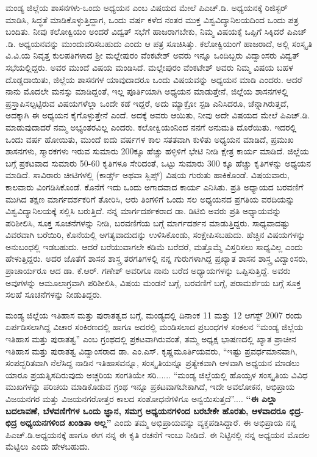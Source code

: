 ಮಂಡ್ಯ ಜಿಲ್ಲೆಯ ಶಾಸನಗಳು-ಒಂದು ಅಧ್ಯಯನ ಎಂಬ ವಿಷಯದ ಮೇಲೆ ಪಿಎಚ್​.ಡಿ. ಅಧ್ಯಯನಕ್ಕೆ ರಿಜಿಸ್ಟರ್​ ಮಾಡಿಸಿ, ಸಿದ್ಧತೆ ಮಾಡಿಕೊಳ್ಳುತ್ತಿದ್ದಾಗ, ಒಂದು ವರ್ಷ ಕಳೆದ ನಂತರ ಮುಕ್ತ ವಿಶ್ವವಿದ್ಯಾನಿಲಯದಿಂದ ಒಂದು ಪತ್ರ ಬಂದಿತು. ನೀವು ಕಲೋಕ್ವಿಯಂ ಅಂದರೆ ವಿದ್ವತ್​ ಸಭೆಗೆ ಹಾಜರಾಗಬೇಕು, ನಿಮ್ಮ ವಿಷಯಕ್ಕೆ ಒಪ್ಪಿಗೆ ಸಿಕ್ಕಿದರೆ ಪಿಎಚ್​.ಡಿ. ಅಧ್ಯಯನವನ್ನು ಮುಂದುವರಿಸಬಹುದು ಎಂದು ಆ ಪತ್ರ ಸೂಚಿಸಿತ್ತು. ಕಲೋಕ್ವಿಯಂಗೆ ಹಾಜರಾದೆ, ಅಲ್ಲಿ ಸಂಸ್ಕೃತಿ ವಿ.ವಿ.ಯ ನಿವೃತ್ತ ಕುಲಪತಿಗಳಾದ ಶ‍್ರೀ ಮಲ್ಲೇಪುರಂ ವೆಂಕಟೇಶ್​ ಅವರು ಇನ್ನೂ ಒಂದಿಬ್ಬರು ವಿದ್ವಾಂಸರು ವಿದ್ವತ್​ ಸಭೆಯಲ್ಲಿದ್ದರು. ಅವರ ಮುಂದೆ ವಿಷಯ ಮಂಡಿಸಿದೆ. ಮಲ್ಲೇಪುರಂ ವೆಂಕಟೇಶ್​ ಅವರು ನಿಮ್ಮ ವಿಷಯ ಬಹಳ ದೊಡ್ಡದಾಯಿತು, ಜಿಲ್ಲೆಯ ಶಾಸನಗಳ ಯಾವುದಾದರೂ ಒಂದು ವಿಷಯವನ್ನು ಅಧ್ಯಯನ ಮಾಡಿ ಎಂದರು. ಆದರೆ ನಾನು ಮೊದಲೇ ಮನಸ್ಸು ಮಾಡಿದ್ದಂತೆ, ಇಲ್ಲ ಪೂರ್ತಿಯಾಗಿ ಅಧ್ಯಯನ ಮಾಡುತ್ತೇನೆ, ಜಿಲ್ಲೆಯ ಶಾಸನಗಳಲ್ಲಿ ಪ್ರಸ್ತಾಪಿಸಲ್ಪಟ್ಟಿರುವ ವಿಷಯಗಳೆಲ್ಲಾ ಒಂದೇ ಕಡೆ ಇದ್ದರೆ, ಅದು ಮ್ಯಾಕ್ರೋ ಸ್ಟಡಿ ಎನಿಸಿದರೂ, ಚೆನ್ನಾಗಿರುತ್ತದೆ, ಅದಕ್ಕಾಗಿ ಈ ಅಧ್ಯಯನ ಕೈಗೊಳ್ಳುತ್ತೇನೆ ಎಂದೆ. ಅದಕ್ಕೆ ಅವರು ಆಯಿತು, ನೀವು ಅದೇ ವಿಷಯದ ಮೇಲೆ ಪಿಎಚ್​.ಡಿ. ಮಾಡುವುದಾದರೆ ನಮ್ಮ ಅಭ್ಯಂತರವಿಲ್ಲ ಎಂದರು. ಕಲೋಕ್ವಿಯಂನಿಂದ ನನಗೆ ಅನುಮತಿ ದೊರೆಯಿತು. ಇದರಲ್ಲಿ ಒಂದು ವರ್ಷ ಹೋಯಿತು, ಮುಂದೆ ಐದು ವರ್ಷಗಳ ಕಾಲ ಸತತವಾಗಿ ಕುಳಿತು ಅಧ್ಯಯನ ಮಾಡಿದೆ, ಪ್ರಮುಖ ಶಾಸನಗಳು, ಸ್ಮಾರಕಗಳು ಇರುವ ಸುಮಾರು 200ಕ್ಕೂ ಹೆಚ್ಚು ಹಳ್ಳಿಳಿಗೆ ಭೇಟಿ ನೀಡಿ ಕ್ಷೇತ್ರ ಕಾರ್ಯ ಮಾಡಿದೆ. ಜಿಲ್ಲೆಯ ಬಗ್ಗೆ ಪ್ರಕಟವಾದ ಸುಮಾರು 50-60 ಕೃತಿಗಳೂ ಸೇರಿದಂತೆ, ಒಟ್ಟು ಸುಮಾರು 300 ಕ್ಕೂ ಹೆಚ್ಚು ಕೃತಿಗಳನ್ನು ಅಧ್ಯಯನ ಮಾಡಿದೆ. ಸಾವಿರಾರು ಚೀಟಿಗಳಲ್ಲಿ (ಕಾರ್ಡ್ಸ್ ಅಥವಾ ಸ್ಲಿಪ್ಸ್​) ವಿಷಯ ಗುರುತು ಹಾಕಿಕೊಂಡೆ. ವಿಷಯವಾರು, ಕಾಲವಾರು ವಿಂಗಡಿಸಿಕೊಂಡೆ. ಕೊನೆಗೆ ಇದು ಒಂದು ಅಗಾದವಾದ ಕಾರ್ಯ ಎನಿಸಿತು. ಪ್ರತಿ ಅಧ್ಯಾಯದ ಬರವಣಿಗೆ ಮುಗಿದ ತಕ್ಷಣ ಮಾರ್ಗದರ್ಶಕರಿಗೆ ತೋರಿಸಿ, ಆರು ತಿಂಗಳಿಗೆ ಒಂದು ಸಲ ಅಧ್ಯಯನದ ಪ್ರಗತಿಯ ವರದಿಯನ್ನು ವಿಶ್ವವಿದ್ಯಾನಿಲಯಕ್ಕೆ ಸಲ್ಲಿಸಿ ಬರುತ್ತಿದೆ. ನನ್ನ ಮಾರ್ಗದರ್ಶಕರಾದ ಡಾ. ಡಿಟಿಬಿ ಅವರು ಪ್ರತಿ ಅಧ್ಯಾಯವನ್ನು ಪರಿಶೀಲಿಸಿ, ಸೂಕ್ತ ಸೂಚನೆಗಳನ್ನು ನೀಡಿ, ಬರವಣಿಗೆಯ ಬಗ್ಗೆ ಮಾರ್ಗದರ್ಶನ ಮಾಡುತ್ತಿದ್ದರು. ಸಾಧ್ಯವಾದಷ್ಟು ವಿವರವಾಗಿ ಬರೆಯಿರಿ, ಕೊನೆಯಲ್ಲಿ ಅಗತ್ಯವಾದುದನ್ನು ಉಳಿಸಿಕೊಂಡು, ಸಂಕ್ಷೇಪಿಸಬಹುದು. ಹೆಚ್ಚಿನ ವಿಷಯಗಳನ್ನು ಅನುಬಂಧಲ್ಲಿ ಇಡಬಹುದು. ಆದರೆ ಬರೆಯುವಾಗಲೇ ಕಡಿಮೆ ಬರೆದರೆ, ಮತ್ತೊಮ್ಮೆ ವಿಸ್ತರಿಸಲು ಸಾಧ್ಯವಿಲ್ಲ ಎಂದು ಹೇಳುತ್ತಿದ್ದರು. ಅದರ ಜೊತೆಗೆ ಶಾಸನ ಶಾಸ್ತ್ರ ತರಗತಿಗಳಲ್ಲಿ ನನ್ನ ಗುರುಗಳಾಗಿದ್ದ ಪ್ರಖ್ಯಾತ ಶಾಸನ ಶಾಸ್ತ್ರ ವಿದ್ವಾಂಸರು, ಪ್ರಾಚಾರ್ಯರೂ ಆದ ಡಾ. ಕೆ.ಆರ್​. ಗಣೇಶ್​ ಅವರಿಗೂ ನಾನು ಬರೆದ ಅಧ್ಯಾಯಗಳನ್ನು ಒಪ್ಪಿಸುತ್ತಿದ್ದೆ. ಅವರು ಅವುಗಳನ್ನು ಆಮೂಲಾಗ್ರವಾಗಿ ಪರಿಶೀಲಿಸಿ, ವಿಷಯ ಮಂಡನೆ ಬಗ್ಗೆ, ಬರವಣಿಗೆ ಬಗ್ಗೆ, ಪರಾಮರ್ಶೆಯ ಬಗ್ಗೆ ಸೂಕ್ತ ಸಲಹೆ ಸೂಚನೆಗಳನ್ನು ನೀಡುತಿದ್ದರು.

ಮಂಡ್ಯ ಜಿಲ್ಲೆಯ ಇತಿಹಾಸ ಮತ್ತು ಪುರಾತತ್ವದ ಬಗ್ಗೆ, ಮಂಡ್ಯದಲ್ಲಿ ದಿನಾಂಕ 11 ಮತ್ತು 12 ಆಗಸ್ಟ್​ 2007 ರಂದು ಏರ್ಪಡಿಸಲಾಗಿದ್ದ ವಿಚಾರ ಸಂಕಿರಣದಲ್ಲಿ ಹಾಗೂ ಅದರಲ್ಲಿ ಮಂಡಿಸಲಾದ ಪ್ರಬಂಧಗಳ ಸಂಕಲನ “ಮಂಡ್ಯ ಜಿಲ್ಲೆಯ ಇತಿಹಾಸ ಮತ್ತು ಪುರಾತತ್ವ” ಎಂಬ ಗ್ರಂಥದಲ್ಲಿ ಪ್ರಕಟವಾಗಿರುವಂತೆ, ತಮ್ಮ ಅಧ್ಯಕ್ಷ ಭಾಷಣದಲ್ಲಿ ಖ್ಯಾತ ಪ್ರಾಚೀನ ಇತಿಹಾಸ ಮತ್ತು ಪುರಾತತ್ವ ವಿದ್ವಾಂಸರಾದ ಡಾ. ಎಂ.ಎಸ್​. ಕೃಷ್ಣಮೂರ್ತಿಯವರು, “ಇಷ್ಟು ಪ್ರವರ್ಧಮಾನವಾಗಿ, ಸಂಪದ್ಭರಿತವಾಗಿ ನೆಲೆಸಿದ್ದ ನಾಡಿನ ಇತಿಹಾಸವನ್ನೂ, ಸಂಸ್ಕೃತಿಯನ್ನೂ ಪ್ರತ್ಯೇಕವಾಗಿ ಆಳವಾಗಿ ಅಧ್ಯಯನ ಮಾಡಲು ಯಾರೂ ಪ್ರಯತ್ನಿಸದಿರುವುದು ಅಚ್ಚರಿಯ ಸಂಗತಿಯೇ ಸರಿ...... “ಮಂಡ್ಯ ಜಿಲ್ಲೆಯಲ್ಲಿ ಹೊಯ್ಸಳ ಸಂಸ್ಕೃತಿಯ ವಿವಿಧ ಮುಖಗಳನ್ನು ಪರಿಚಯ ಮಾಡಿಕೊಡುವ ಗ್ರಂಥ ಇನ್ನೂ ಪ್ರಕಟವಾಗಬೇಕಾಗಿದೆ, ಇದೇ ಅವಲೋಕನ, ಅಭಿಪ್ರಾಯ ವಿಜಯನಗರ ಮತ್ತು ವಿಜಯನಗರೋತ್ತರ ಕಾಲದ ಸಂಶೋಧನೆಗಳಿಗೂ ಅನ್ವಯಿಸುತ್ತದೆ”.... \textbf{“ಈ ಎಲ್ಲಾ ಬದಲಾವಣೆ, ಬೆಳವಣಿಗೆಗಳ ಒಂದು ಜ್ಞಾನ, ಸಮಗ್ರ ಅಧ್ಯಯನಗಳಿಂದ ಬರಬೇಕೇ ಹೊರತು, ಆಳವಾದರೂ ಛಿದ್ರ-ಛಿದ್ರ ಅಧ್ಯಯನಗಳಿಂದ ಖಂಡಿತಾ ಅಲ್ಲ”} ಎಂದು ತಮ್ಮ ಅಭಿಪ್ರಾಯವನ್ನು ವ್ಯಕ್ತಪಡಿಸಿದ್ದಾರೆ. ಈ ಅಭಿಪ್ರಾಯ ನನ್ನ ಪಿಎಚ್​.ಡಿ.ಅಧ್ಯಯನಕ್ಕೆ ಹಾಗೂ ಈಗ ನನ್ನ ಈ ಕೃತಿ ರಚನೆಗೆ ಇಂಬು ನೀಡಿದೆ. ಈ ನಿಟ್ಟಿನಲ್ಲಿ ನನ್ನ ಅಧ್ಯಯನ ಮೊದಲ ಮೆಟ್ಟಿಲು ಎಂದು ಹೇಳಬಹುದು.

